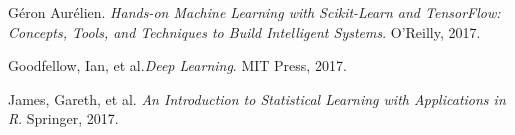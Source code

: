 \documentclass[12pt,letterpaper]{article}
\begin{document}



\begin{thebibliography}{9}


Géron Aurélien. \textit{Hands-on Machine Learning with Scikit-Learn and TensorFlow: Concepts, Tools, and Techniques to Build Intelligent Systems}. O'Reilly, 2017.

Goodfellow, Ian, et al.\textit{Deep Learning}. MIT Press, 2017.

James, Gareth, et al. \textit{An Introduction to Statistical Learning with Applications in R}. Springer, 2017.


\end{thebibliography}


\end{document}
